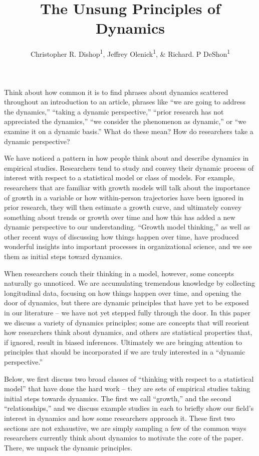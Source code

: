 \documentclass[english,,man]{apa6}
\title{The Unsung Principles of Dynamics}
\author{Christopher R. Dishop\textsuperscript{1}, Jeffrey
Olenick\textsuperscript{1}, \& Richard. P DeShon\textsuperscript{1}}
\date{}
\affiliation{
\vspace{0.5cm}
\textsuperscript{1} Michigan State University}
\theoremstyle{definition}
\theoremstyle{definition}
\theoremstyle{definition}
\theoremstyle{remark}
\begin{document}
\maketitle

Think about how common it is to find phrases about dynamics scattered
throughout an introduction to an article, phrases like \enquote{we are
going to address the dynamics,} \enquote{taking a dynamic perspective,}
\enquote{prior research has not appreciated the dynamics,} \enquote{we
consider the phenomenon as dynamic,} or \enquote{we examine it on a
dynamic basis.} What do these mean? How do researchers take a dynamic
perspective?

We have noticed a pattern in how people think about and describe
dynamics in empirical studies. Researchers tend to study and convey
their dynamic process of interest with respect to a statistical model or
class of models. For example, researchers that are familiar with growth
models will talk about the importance of growth in a variable or how
within-person trajectories have been ignored in prior research, they
will then estimate a growth curve, and ultimately convey something about
trends or growth over time and how this has added a new dynamic
perspective to our understanding. \enquote{Growth model thinking,} as
well as other recent ways of discussing how things happen over time,
have produced wonderful insights into important processes in
organizational science, and we see them as initial steps toward
dynamics.

When researchers couch their thinking in a model, however, some concepts
naturally go unnoticed. We are accumulating tremendous knowledge by
collecting longitudinal data, focusing on how things happen over time,
and opening the door of dynamics, but there are dynamic principles that
have yet to be exposed in our literature -- we have not yet stepped
fully through the door. In this paper we discuss a variety of dynamics
principles; some are concepts that will reorient how researchers think
about dynamics, and others are statistical properties that, if ignored,
result in biased inferences. Ultimately we are bringing attention to
principles that should be incorporated if we are truly interested in a
\enquote{dynamic perspective.}

Below, we first discuss two broad classes of \enquote{thinking with
respect to a statistical model} that have done the hard work -- they are
sets of empirical studies taking initial steps towards dynamics. The
first we call \enquote{growth,} and the second \enquote{relationships,}
and we discuss example studies in each to briefly show our field's
interest in dynamics and how some researchers approach it. These first
two sections are not exhaustive, we are simply sampling a few of the
common ways researchers currently think about dynamics to motivate the
core of the paper. There, we unpack the dynamic principles.
\end{document}
